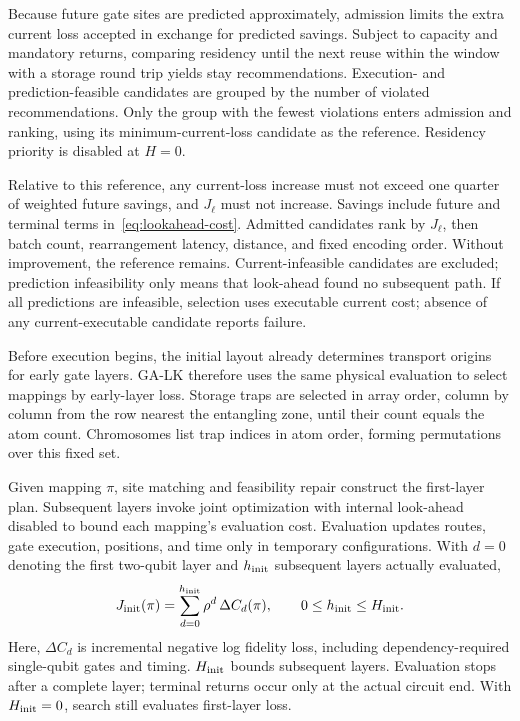 Because future gate sites are predicted approximately, admission limits the extra current loss accepted in exchange for predicted savings. Subject to capacity and mandatory returns, comparing residency until the next reuse within the window with a storage round trip yields stay recommendations. Execution- and prediction-feasible candidates are grouped by the number of violated recommendations. Only the group with the fewest violations enters admission and ranking, using its minimum-current-loss candidate as the reference. Residency priority is disabled at $H=0$.

Relative to this reference, any current-loss increase must not exceed one quarter of weighted future savings, and $J_\ell$ must not increase. Savings include future and terminal terms in~\eqref{eq:lookahead-cost}. Admitted candidates rank by $J_\ell$, then batch count, rearrangement latency, distance, and fixed encoding order. Without improvement, the reference remains. Current-infeasible candidates are excluded; prediction infeasibility only means that look-ahead found no subsequent path. If all predictions are infeasible, selection uses executable current cost; absence of any current-executable candidate reports failure.


Before execution begins, the initial layout already determines transport origins for early gate layers. GA-LK therefore uses the same physical evaluation to select mappings by early-layer loss. Storage traps are selected in array order, column by column from the row nearest the entangling zone, until their count equals the atom count. Chromosomes list trap indices in atom order, forming permutations over this fixed set.

Given mapping $\pi$, site matching and feasibility repair construct the first-layer plan. Subsequent layers invoke joint optimization with internal look-ahead disabled to bound each mapping's evaluation cost. Evaluation updates routes, gate execution, positions, and time only in temporary configurations. With $d=0$ denoting the first two-qubit layer and $h_{\rm init}$ subsequent layers actually evaluated,
\begin{equation}
J_{\rm init}(\pi)=
\sum_{d=0}^{h_{\rm init}}\rho^d\,\Delta C_d(\pi),
\qquad 0\le h_{\rm init}\le H_{\rm init}.
\label{eq:initial-lookahead}
\end{equation}
Here, $\Delta C_d$ is incremental negative log fidelity loss, including dependency-required single-qubit gates and timing. $H_{\rm init}$ bounds subsequent layers. Evaluation stops after a complete layer; terminal returns occur only at the actual circuit end. With $H_{\rm init}=0$, search still evaluates first-layer loss.

